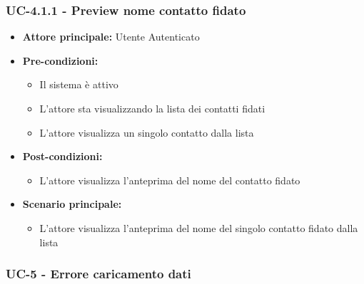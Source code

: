 \documentclass[a4paper,12pt]{article}
\begin{document}
\subsubsection{UC-4.1.1 - Preview nome contatto fidato} \label{subsec:UC-4.1.1}
\begin{itemize}
    \item \textbf{Attore principale:} Utente Autenticato
    \item \textbf{Pre-condizioni:}
    \begin{itemize}
        \item Il sistema è attivo
        \item L'attore sta visualizzando la lista dei contatti fidati
        \item L'attore visualizza un singolo contatto dalla lista
    \end{itemize}
    \item \textbf{Post-condizioni:}
    \begin{itemize}
        \item L'attore visualizza l'anteprima del nome del contatto fidato
    \end{itemize}
    \item \textbf{Scenario principale:} 
    \begin{itemize}
        \item L'attore visualizza l'anteprima del nome del singolo contatto fidato dalla lista
    \end{itemize}
\end{itemize}

\subsubsection{UC-5 - Errore caricamento dati} \label{sec:UC-5}
\end{document}
